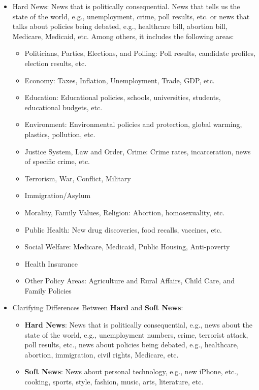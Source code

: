 \documentclass[12pt, letterpaper]{article}
\begin{document}
\begin{itemize}
\begin{itemize}
            \item Hard News: News that is politically consequential. News that tells us the state of the world, e.g., unemployment, crime, poll results, etc. or news that talks about policies being debated, e.g., healthcare bill, abortion bill, Medicare, Medicaid, etc. Among others, it includes the following areas:
            \begin{itemize}
                \item Politicians, Parties, Elections, and Polling: Poll results, candidate profiles, election results, etc.
                \item Economy: Taxes, Inflation, Unemployment, Trade, GDP, etc.
                \item Education: Educational policies, schools, universities, students, educational budgets, etc.
                \item Environment: Environmental policies and protection, global warming, plastics, pollution, etc. 
                \item Justice System, Law and Order, Crime: Crime rates, incarceration, news of specific crime, etc.
                \item Terrorism, War, Conflict, Military
                \item Immigration/Asylum
                \item Morality, Family Values, Religion: Abortion, homosexuality, etc.
                \item Public Health: New drug discoveries, food recalls, vaccines, etc.
                \item Social Welfare: Medicare, Medicaid, Public Housing, Anti-poverty
                \item Health Insurance
                \item Other Policy Areas: Agriculture and Rural Affairs, Child Care, and Family Policies
            \end{itemize}
        \item Clarifying Differences Between \textbf{Hard} and \textbf{Soft News}:
            \begin{itemize}
                \item \textbf{Hard News}: News that is politically consequential, e.g., news about the state of the world, e.g., unemployment numbers, crime, terrorist attack, poll results, etc., news about policies being debated, e.g., healthcare, abortion, immigration, civil rights, Medicare, etc.
                \item  \textbf{Soft News}: News about personal technology, e.g., new iPhone, etc., cooking, sports, style, fashion, music, arts, literature, etc.
            \end{itemize}


\end{itemize}
\end{itemize}
\end{document}
